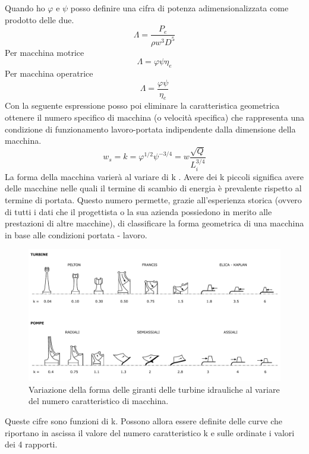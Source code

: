 Quando ho $\varphi$ e $\psi$ posso definire una cifra di potenza adimensionalizzata come prodotto delle due.
\begin{equation}
\Lambda = \frac{P_e}{\rho w^3 D^5}
\end{equation}
Per macchina motrice
\begin{equation}
\Lambda = \varphi \psi \eta_e
\end{equation}
Per macchina operatrice
\begin{equation}
\Lambda = \frac{\varphi \psi}{\eta_e}
\end{equation}
Con la seguente espressione posso poi eliminare la caratteristica geometrica ottenere il numero specifico di macchina (o velocità specifica) che rappresenta una condizione di funzionamento lavoro-portata indipendente dalla dimensione della macchina. 
\begin{equation}
w_s = k = \varphi^{1/2} \psi^{-3/4} = w \frac{\sqrt{Q}}{L_i^{3/4}}
\end{equation}
La forma della macchina varierà al variare di k . Avere dei k piccoli significa avere delle macchine nelle quali il termine di scambio di energia è prevalente rispetto al termine di portata. Questo numero permette, grazie all'esperienza storica (ovvero di tutti i dati che il progettista o la sua azienda possiedono in merito alle prestazioni di altre macchine), di classificare la forma geometrica di una macchina in base alle condizioni portata - lavoro.
\begin{figure}[h!]
\centering
  \includegraphics[width=\textwidth]{fig/numcar.pdf}
\caption{Variazione della forma delle giranti delle turbine idrauliche al variare del numero caratteristico di macchina.}
\label{fig:numcar}
\end{figure}
Queste cifre sono funzioni di k. Possono allora essere definite delle curve che riportano in ascissa il valore del numero caratteristico k e sulle ordinate i valori dei 4 rapporti.
